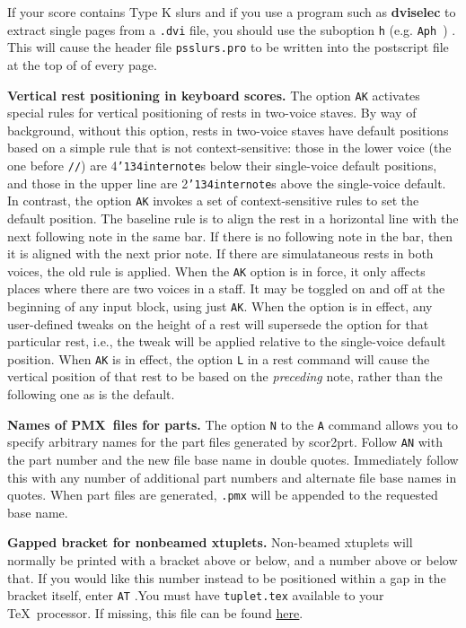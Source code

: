 \documentclass[11pt]{article}
\def\bs{{\tt\char'134}}
\newcommand\PMXX{\textbf{PMX}}
\newcommand\PMX{\PMXX~}
\def\newfrom{2.59}  %
\def\NEW#1{\ifdim#1 pt<\newfrom pt\else%
\marginpar{\fbox{#1}}\fi}
\begin{document}
If \NEW{2.5} your score contains Type K slurs and if you use a program such as 
{\bf dviselec} to extract single pages 
from a {\tt .dvi} file, you should use the suboption {\tt h} (e.g. 
{\tt Aph}~) . This will cause the header file {\tt psslurs.pro} to be written 
into the postscript file at the top of of every page.

{\bf Vertical rest positioning in keyboard scores.}
The\NEW{2.6} option {\tt AK} activates special rules for vertical positioning of rests in
two-voice staves. By way of background, without this option, rests in two-voice
staves have default positions based on a simple rule that is not 
context-sensitive: those in the lower voice (the one before {\tt//}) are 
4\bs{\tt internote}s below their single-voice default positions, and those in
the upper line are 2\bs{\tt internote}s above the single-voice default. In contrast, the 
option {\tt AK} invokes a set of context-sensitive rules to set the default 
position. The baseline rule is to align the rest in a horizontal line with the
next following note in the same bar. If there is no following note in the bar,
then it is aligned with the next prior note. If there are simulataneous rests
in both voices, the old rule is applied. When the {\tt AK} option is in force,
it only affects places where there are two voices in a staff. It may be toggled
on and off at the beginning of any input block, using just {\tt AK}. When the
option is in effect, any user-defined tweaks on the height of a rest will
supersede the option for that particular rest, i.e., the tweak will be applied
relative to the single-voice default position. When {\tt AK} is in effect, the
option {\tt L} in a rest command will cause the vertical position of that rest
to be based on the {\it preceding} note, rather than the following one as is
the default. 

{\bf Names of \PMX files for parts.}
The \label{ANDirective}option {\tt N} to the {\tt A} command allows you to specify 
arbitrary names for the part files generated by 
{\bfx scor2prt}. Follow {\tt AN} with the part number and the new file base name in double 
quotes. Immediately follow this with any number of additional part numbers and 
alternate file base names in quotes. When part files are generated, {\tt .pmx} will be
appended to the requested base name. 

{\bf Gapped bracket for nonbeamed xtuplets.}
Non-beamed \label{ATDirective}\NEW{2.5}xtuplets will normally be printed with 
a bracket above or below, and 
a number above or below that. If you would like this number instead to be 
positioned within a gap in the bracket itself, enter {\tt AT} .You must have
{\tt tuplet.tex} available to your \TeX~processor. If missing, this file 
can be found 
\href{http://www.icking-music-archive.org/software/musixtex/musixtex.zip}
{\underline{here}}.
\end{document}
